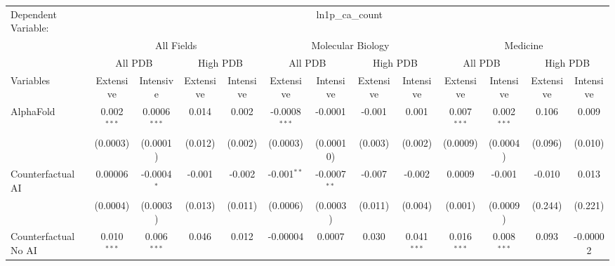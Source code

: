 \begingroup
\centering
\begin{tabular}{lcccccccccccc}
   \tabularnewline \midrule \midrule
   Dependent Variable: & \multicolumn{12}{c}{ln1p\_ca\_count}\\
 & \multicolumn{4}{c}{All Fields} & \multicolumn{4}{c}{Molecular Biology} & \multicolumn{4}{c}{Medicine} \\
\cmidrule(lr){2-5} \cmidrule(lr){6-9} \cmidrule(lr){10-13}
 & \multicolumn{2}{c}{All PDB} & \multicolumn{2}{c}{High PDB} & \multicolumn{2}{c}{All PDB} & \multicolumn{2}{c}{High PDB} & \multicolumn{2}{c}{All PDB} & \multicolumn{2}{c}{High PDB} \\
\cmidrule(lr){2-3} \cmidrule(lr){4-5} \cmidrule(lr){6-7} \cmidrule(lr){8-9} \cmidrule(lr){10-11} \cmidrule(lr){12-13}
Variables & \multicolumn{1}{c}{Extensive} & \multicolumn{1}{c}{Intensive} & \multicolumn{1}{c}{Extensive} & \multicolumn{1}{c}{Intensive} & \multicolumn{1}{c}{Extensive} & \multicolumn{1}{c}{Intensive} & \multicolumn{1}{c}{Extensive} & \multicolumn{1}{c}{Intensive} & \multicolumn{1}{c}{Extensive} & \multicolumn{1}{c}{Intensive} & \multicolumn{1}{c}{Extensive} & \multicolumn{1}{c}{Intensive} \\
\cmidrule(lr){1-1}\cmidrule(lr){2-2} \cmidrule(lr){3-3} \cmidrule(lr){4-4} \cmidrule(lr){5-5} \cmidrule(lr){6-6} \cmidrule(lr){7-7} \cmidrule(lr){8-8} \cmidrule(lr){9-9} \cmidrule(lr){10-10} \cmidrule(lr){11-11} \cmidrule(lr){12-12} \cmidrule(lr){13-13}
   AlphaFold                                & 0.002$^{***}$ & 0.0006$^{***}$  & 0.014        & 0.002    & -0.0008$^{***}$ & -0.0001        & -0.001  & 0.001          & 0.007$^{***}$ & 0.002$^{***}$   & 0.106   & 0.009\\   
                                            & (0.0003)      & (0.0001)        & (0.012)      & (0.002)  & (0.0003)        & (0.00010)      & (0.003) & (0.002)        & (0.0009)      & (0.0004)        & (0.096) & (0.010)\\   
   Counterfactual AI                        & 0.00006       & -0.0004$^{*}$   & -0.001       & -0.002   & -0.001$^{**}$   & -0.0007$^{**}$ & -0.007  & -0.002         & 0.0009        & -0.001          & -0.010  & 0.013\\   
                                            & (0.0004)      & (0.0003)        & (0.013)      & (0.011)  & (0.0006)        & (0.0003)       & (0.011) & (0.004)        & (0.001)       & (0.0009)        & (0.244) & (0.221)\\   
   Counterfactual No AI                     & 0.010$^{***}$ & 0.006$^{***}$   & 0.046        & 0.012    & -0.00004        & 0.0007         & 0.030   & 0.041$^{***}$  & 0.016$^{***}$ & 0.008$^{***}$   & 0.093   & -0.00002\\   

\end{tabular}
